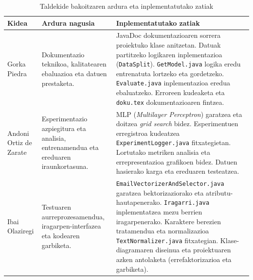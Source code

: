 \documentclass[12pt, a4paper]{article}
\begin{document}
\begin{table}[H]
    \centering
    \caption{Taldekide bakoitzaren ardura eta inplementatutako zatiak}
    \begin{tabular}{p{2.5cm}p{4cm}p{6.5cm}}
        \toprule
        \textbf{Kidea} & \textbf{Ardura nagusia} & \textbf{Inplementatutako zatiak} \\
        \midrule
        Gorka Piedra &
        Dokumentazio teknikoa, kalitatearen ebaluazioa eta datuen prestaketa. &
        \textbullet{} JavaDoc dokumentazioaren sorrera proiektuko klase anitzetan. \newline
        \textbullet{} Datuak partitzeko logikaren inplementazioa (\texttt{DataSplit}). \newline
        \textbullet{} \texttt{GetModel.java} logika eredu entrenatuta lortzeko eta gordetzeko. \newline
        \textbullet{} \texttt{Evaluate.java} inplementazioa eredua ebaluatzeko. \newline
        \textbullet{} Erroreen kudeaketa eta \texttt{doku.tex} dokumentazioaren fintzea. \\
        \midrule
        Andoni Ortiz de Zarate &
        Esperimentazio azpiegitura eta analisia, entrenamendua eta ereduaren iraunkortasuna. &
        \textbullet{} MLP (\textit{Multilayer Perceptron}) garatzea eta doitzea \textit{grid search} bidez. \newline
        \textbullet{} Esperimentuen erregistroa kudeatzea   \texttt{ExperimentLogger.java} fitxategietan. \newline
        \textbullet{} Lortutako metriken analisia eta errepresentazioa grafikoen bidez.\newline 
        \textbullet{} Datuen hasierako karga eta ereduaren testeatzea. \\
        \midrule

        Ibai Olaziregi &
        Testuaren aurreprozesamendua, iragarpen-interfazea eta kodearen garbiketa. &
        \textbullet{} \texttt{EmailVectorizerAndSelector.java} garatzea bektorizaziorako eta atributu-hautapenerako. \newline
        \textbullet{} \texttt{Iragarri.java} inplementatzea mezu berrien iragarpenerako. \newline
        \textbullet{} Karaktere berezien tratamendua eta normalizazioa \texttt{TextNormalizer.java} fitxategian. \newline
        \textbullet{} Klase-diagramaren diseinua eta proiektuaren azken antolaketa (errefaktorizazioa eta garbiketa). \\
        \bottomrule
    \end{tabular}
    \label{tab:ardura}
\end{table}
\end{document}
